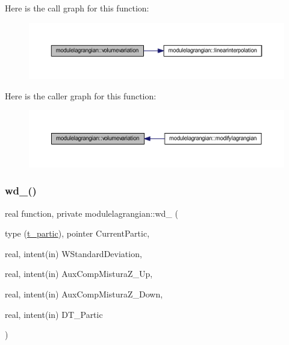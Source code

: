 Here is the call graph for this function\+:\nopagebreak
\begin{figure}[H]
\begin{center}
\leavevmode
\includegraphics[width=350pt]{namespacemodulelagrangian_aac3ffc27a32f64e9bc13d06c25227655_cgraph}
\end{center}
\end{figure}
Here is the caller graph for this function\+:\nopagebreak
\begin{figure}[H]
\begin{center}
\leavevmode
\includegraphics[width=350pt]{namespacemodulelagrangian_aac3ffc27a32f64e9bc13d06c25227655_icgraph}
\end{center}
\end{figure}
\mbox{\label{namespacemodulelagrangian_a017fc1ab12cc04b5c4839d5ea0b54365}} 
\subsubsection{\texorpdfstring{wd\+\_\+()}{wd\_()}}
{\footnotesize\ttfamily real function, private modulelagrangian\+::wd\+\_\+ (\begin{DoxyParamCaption}\item[{type (\mbox{\hyperlink{structmodulelagrangian_1_1t__partic}{t\+\_\+partic}}), pointer}]{Current\+Partic,  }\item[{real, intent(in)}]{W\+Standard\+Deviation,  }\item[{real, intent(in)}]{Aux\+Comp\+Mistura\+Z\+\_\+\+Up,  }\item[{real, intent(in)}]{Aux\+Comp\+Mistura\+Z\+\_\+\+Down,  }\item[{real, intent(in)}]{D\+T\+\_\+\+Partic }\end{DoxyParamCaption})\hspace{0.3cm}{\ttfamily [private]}}

